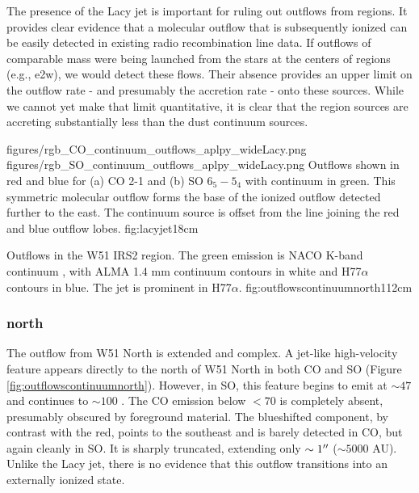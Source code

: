 \documentclass{emulateapj}
\begin{document}
The presence of the Lacy jet is important for ruling out outflows from \hii
regions.  It provides clear evidence that a molecular outflow that is
subsequently ionized can be easily detected in existing radio recombination
line data.  If outflows of comparable mass were being launched from the stars
at the centers of \hchii regions (e.g., e2w), we would detect these flows.
Their absence provides an upper limit on the outflow rate - and presumably the
accretion rate - onto these sources.  While we cannot yet make that limit
quantitative, it is clear that the \hchii region sources are accreting
substantially less than the dust continuum sources.



\FigureTwo
{figures/rgb_CO_continuum_outflows_aplpy_wideLacy.png}
{figures/rgb_SO_continuum_outflows_aplpy_wideLacy.png}
{Outflows shown in red and blue for (a) CO 2-1 and (b) SO $6_5-5_4$ with
continuum in green.  This symmetric molecular outflow forms the base of the
\citet{Lacy2007a} ionized outflow detected further to the east.
The continuum source is offset from the line joining the red and blue outflow lobes.}
{fig:lacyjet}{1}{8cm}


{Outflows in the W51 IRS2 region.  The green emission is NACO K-band continuum
\citep{Barbosa2008a}, with ALMA 1.4 mm continuum contours in white and
H77$\alpha$ contours in blue.  The \citet{Lacy2007a} jet is prominent in
H77$\alpha$.}
{fig:outflowscontinuumnorth}{1}{12cm}

\subsubsection{north}
The outflow from W51 North is extended and complex.
A jet-like high-velocity feature appears directly to the north of W51 North in
both CO and SO (Figure \ref{fig:outflowscontinuumnorth}).  However, in SO, this feature begins to emit at $\sim47$ \kms
and continues to $\sim 100$ \kms.  The CO emission below $<70$ \kms is
completely absent, presumably obscured by foreground material.  The blueshifted
component, by contrast with the red, points to the southeast and is barely
detected in CO, but again cleanly in SO.  It is sharply truncated, extending
only $\sim1 \mbox{$^{\prime\prime}$}$ ($\sim5000$ AU).  Unlike the Lacy jet, there is no
evidence that this outflow transitions into an externally ionized state.
\end{document}
